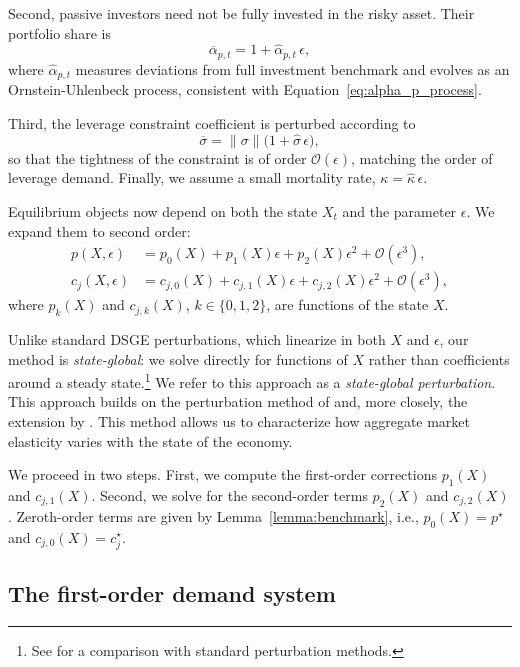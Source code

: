 \documentclass[12pt,english]{article}
\begin{document}
Second, passive investors need not be fully invested in the risky asset. Their portfolio share is  
\begin{equation}\label{eq:apbar_index}
    \overline{\alpha}_{p,t}=1+\hat{\alpha}_{p,t}\,\epsilon,
\end{equation}
where $\hat{\alpha}_{p,t}$ measures deviations from full investment benchmark and evolves as an Ornstein-Uhlenbeck process, consistent with Equation~\eqref{eq:alpha_p_process}.


Third, the leverage constraint coefficient is perturbed according to
\begin{equation}\label{eq:sig_bar-perturb}
    \overline{\sigma}=\|\sigma\|\big(1+\hat{\sigma}\,\epsilon\big),
\end{equation}
so that the tightness of the constraint is of order $\mathcal{O}(\epsilon)$, matching the order of leverage demand. Finally, we assume a small mortality rate, $\kappa=\hat{\kappa}\,\epsilon$.


Equilibrium objects now depend on both the state $X_t$ and the parameter $\epsilon$. We expand them to second order:
\begin{align}
    p(X,\epsilon) &= p_0(X) + p_1(X)\epsilon + p_2(X)\epsilon^2 + \mathcal{O}(\epsilon^3), \\
    c_j(X,\epsilon) &= c_{j,0}(X) + c_{j,1}(X)\epsilon + c_{j,2}(X)\epsilon^2 + \mathcal{O}(\epsilon^3),
\end{align}
where $p_k(X)$ and $c_{j,k}(X)$, $k\in\{0,1,2\}$, are functions of the state $X$.

Unlike standard DSGE perturbations, which linearize in both $X$ and $\epsilon$, our method is \emph{state-global}: we solve directly for functions of $X$ rather than coefficients around a steady state.\footnote{See \citet{kargar2020competitive} for a comparison with standard perturbation methods.} 
We refer to this approach as a \emph{state-global perturbation}. 
This approach builds on the perturbation method of \citet{kogan2001risk} and, more closely, the extension 
by \citet{Silva/riskchannel}.
This method allows us to characterize how aggregate market elasticity varies with the state of the economy.

We proceed in two steps. First, we compute the first-order corrections $p_1(X)$ and $c_{j,1}(X)$. Second, we solve for the second-order terms $p_2(X)$ and $c_{j,2}(X)$. Zeroth-order terms are given by Lemma~\ref{lemma:benchmark}, i.e., $p_0(X)=p^\star$ and $c_{j,0}(X)=c_j^\star$.


\subsection{The first-order demand system}
\end{document}
